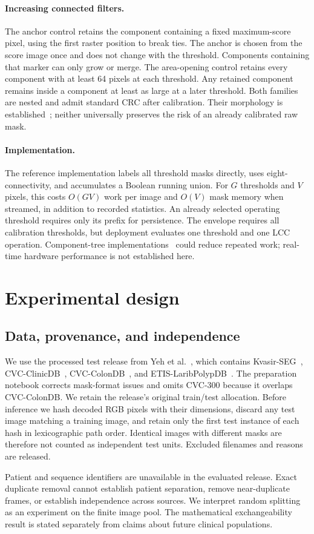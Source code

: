 \documentclass[11pt,a4paper]{article}
\begin{document}
\paragraph{Increasing connected filters.}
The anchor control retains the component containing a fixed maximum-score pixel, using the first raster position to break ties. The anchor is chosen from the score image once and does not change with the threshold. Components containing that marker can only grow or merge. The area-opening control retains every component with at least 64 pixels at each threshold. Any retained component remains inside a component at least as large at a later threshold. Both families are nested and admit standard CRC after calibration. Their morphology is established~\cite{connected}; neither universally preserves the risk of an already calibrated raw mask.

\paragraph{Implementation.}
The reference implementation labels all threshold masks directly, uses eight-connectivity, and accumulates a Boolean running union. For $G$ thresholds and $V$ pixels, this costs $O(GV)$ work per image and $O(V)$ mask memory when streamed, in addition to recorded statistics. An already selected operating threshold requires only its prefix for persistence. The envelope requires all calibration thresholds, but deployment evaluates one threshold and one LCC operation. Component-tree implementations~\cite{connected} could reduce repeated work; real-time hardware performance is not established here.

\section{Experimental design}
\subsection{Data, provenance, and independence}
We use the processed test release from Yeh et al.~\cite{crt}, which contains Kvasir-SEG~\cite{kvasir}, CVC-ClinicDB~\cite{clinic}, CVC-ColonDB~\cite{colondb}, and ETIS-LaribPolypDB~\cite{etis}. The preparation notebook corrects mask-format issues and omits CVC-300 because it overlaps CVC-ColonDB. We retain the release's original train/test allocation. Before inference we hash decoded RGB pixels with their dimensions, discard any test image matching a training image, and retain only the first test instance of each hash in lexicographic path order. Identical images with different masks are therefore not counted as independent test units. Excluded filenames and reasons are released.

Patient and sequence identifiers are unavailable in the evaluated release. Exact duplicate removal cannot establish patient separation, remove near-duplicate frames, or establish independence across sources. We interpret random splitting as an experiment on the finite image pool. The mathematical exchangeability result is stated separately from claims about future clinical populations.
\end{document}
